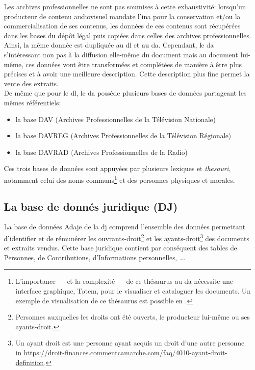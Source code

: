 Les archives professionnelles ne sont pas soumises à cette exhaustivité: lorsqu'un producteur de contenu audiovisuel mandate l'\ac{ina} pour la conservation et/ou la commercialisation de ses contenus, les données de ces contenus sont récupérées dans les bases du dépôt légal puis copiées dans celles des archives professionnelles. Ainsi, la même donnée est dupliquée au \ac{dl} et au \ac{da}. Cependant, le \ac{da} s'intéressant non pas à la diffusion elle-même du document mais au document lui-même, ces données vont être transformées et complétées de manière à être plus précises et à avoir une meilleure description. Cette description plus fine permet la vente des extraits.\\

De même que pour le \ac{dl}, le \ac{da} possède plusieurs bases de données partageant les mêmes référentiels:
\begin{itemize}
	\item la base DAV (Archives Professionnelles de la Télévision Nationale)
	\item la base DAVREG (Archives Professionnelles de la Télévision Régionale)
	\item la base DAVRAD (Archives Professionnelles de la Radio)
\end{itemize}
\bigskip

Ces trois bases de données sont appuyées par plusieurs lexiques et \textit{thesauri}, notamment celui des noms communs\footnote{L'importance --- et la complexité --- de ce thésaurus au \ac{da} nécessite une interface graphique, \og Totem\fg{}, pour le visualiser et cataloguer les documents. Un exemple de visualisation de ce thésaurus est possible en .} et des personnes physiques et morales.

\subsection{\label{I-B-2-c}La base de donnés juridique (DJ)}

La base de données \og Adaje\fg{} de la \ac{dj} comprend l'ensemble des données permettant d'identifier et de rémunérer les ouvrants-droit\footnote{Personnes auxquelles les droits ont été ouverts, le producteur lui-même ou ses ayants-droit.} et les ayants-droit\footnote{\og Un ayant droit est une personne ayant acquis un droit d'une autre personne\fg{} in \url{https://droit-finances.commentcamarche.com/faq/4010-ayant-droit-definition}.} des documents et extraits vendus. Cette base juridique contient par conséquent des tables de Personnes, de Contributions, d'Informations personnelles, \dots.\\


